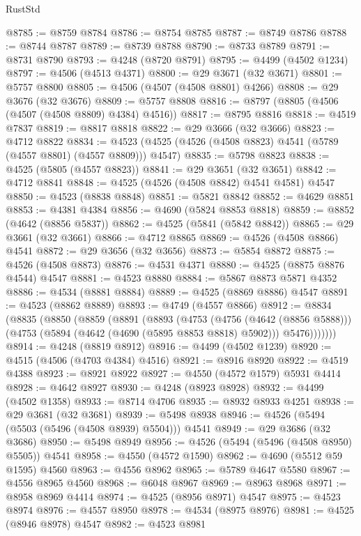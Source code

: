 \begin{lexlean}{RustStd}
\begin{coremodule}
@8785 := @8759 @8784
@8786 := @8754 @8785
@8787 := @8749 @8786
@8788 := @8744 @8787
@8789 := @8739 @8788
@8790 := @8733 @8789
@8791 := @8731 @8790
@8793 := @4248 (@8720 @8791)
@8795 := @4499 (@4502 @1234)
@8797 := @4506 (@4513 @4371)
@8800 := @29 @3671 (@32 @3671)
@8801 := @5757 @8800
@8805 := @4506 (@4507 (@4508 @8801) @4266)
@8808 := @29 @3676 (@32 @3676)
@8809 := @5757 @8808
@8816 := @8797 (@8805 (@4506 (@4507 (@4508 @8809) @4384) @4516))
@8817 := @8795 @8816
@8818 := @4519 @7837
@8819 := @8817 @8818
@8822 := @29 @3666 (@32 @3666)
@8823 := @4712 @8822
@8834 := @4523 (@4525 (@4526 (@4508 @8823) @4541 (@5789 (@4557 @8801) (@4557 @8809))) @4547)
@8835 := @5798 @8823
@8838 := @4525 (@5805 (@4557 @8823))
@8841 := @29 @3651 (@32 @3651)
@8842 := @4712 @8841
@8848 := @4525 (@4526 (@4508 @8842) @4541 @4581) @4547
@8850 := @4523 (@8838 @8848)
@8851 := @5821 @8842
@8852 := @4629 @8851
@8853 := @4381 @4384
@8856 := @4690 (@5824 @8853 @8818)
@8859 := @8852 (@4642 (@8856 @5837))
@8862 := @4525 (@5841 (@5842 @8842))
@8865 := @29 @3661 (@32 @3661)
@8866 := @4712 @8865
@8869 := @4526 (@4508 @8866) @4541
@8872 := @29 @3656 (@32 @3656)
@8873 := @5854 @8872
@8875 := @4526 (@4508 @8873)
@8876 := @4531 @4371
@8880 := @4525 (@8875 @8876 @4544) @4547
@8881 := @4523 @8880
@8884 := @5867 @8873 @5871 @4352
@8886 := @4534 (@8881 @8884)
@8889 := @4525 (@8869 @8886) @4547
@8891 := @4523 (@8862 @8889)
@8893 := @4749 (@4557 @8866)
@8912 := @8834
    (@8835
      (@8850
        (@8859
          (@8891
            (@8893
              (@4753
                (@4756 (@4642 (@8856 @5888)))
                (@4753 (@5894 (@4642 (@4690 (@5895 @8853 @8818) @5902))) @5476)))))))
@8914 := @4248 (@8819 @8912)
@8916 := @4499 (@4502 @1239)
@8920 := @4515 (@4506 (@4703 @4384) @4516)
@8921 := @8916 @8920
@8922 := @4519 @4388
@8923 := @8921 @8922
@8927 := @4550 (@4572 @1579) @5931 @4414
@8928 := @4642 @8927
@8930 := @4248 (@8923 @8928)
@8932 := @4499 (@4502 @1358)
@8933 := @8714 @4706
@8935 := @8932 @8933 @4251
@8938 := @29 @3681 (@32 @3681)
@8939 := @5498 @8938
@8946 := @4526 (@5494 (@5503 (@5496 (@4508 @8939) @5504))) @4541
@8949 := @29 @3686 (@32 @3686)
@8950 := @5498 @8949
@8956 := @4526 (@5494 (@5496 (@4508 @8950) @5505)) @4541
@8958 := @4550 (@4572 @1590)
@8962 := @4690 (@5512 @59 @1595) @4560
@8963 := @4556 @8962
@8965 := @5789 @4647 @5580
@8967 := @4556 @8965 @4560
@8968 := @6048 @8967
@8969 := @8963 @8968
@8971 := @8958 @8969 @4414
@8974 := @4525 (@8956 @8971) @4547
@8975 := @4523 @8974
@8976 := @4557 @8950
@8978 := @4534 (@8975 @8976)
@8981 := @4525 (@8946 @8978) @4547
@8982 := @4523 @8981

\end{coremodule}
\end{lexlean}
